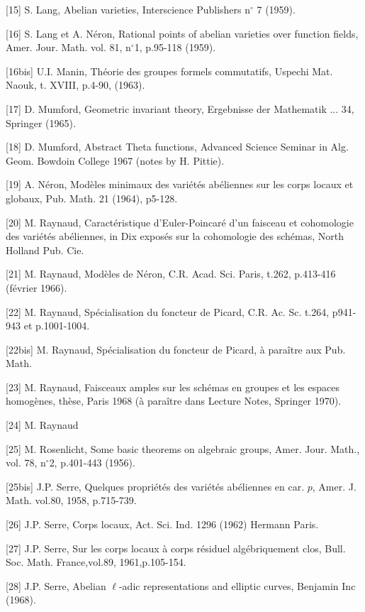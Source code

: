{[}15] S. Lang, Abelian varieties, Interscience Publishers n$^\circ$ 7 (1959).

{[}16] S. Lang et A. Néron, Rational points of abelian varieties over function fields, Amer. Jour. Math. vol. 81, n$^\circ$1, p.95-118 (1959).

{[}16bis] U.I. Manin, Théorie des groupes formels commutatifs, Uspechi Mat. Naouk, t. XVIII, p.4-90, (1963).

{[}17] D. Mumford, Geometric invariant theory, Ergebnisse der Mathematik ... 34, Springer (1965).

{[}18] D. Mumford, Abstract Theta functions, Advanced Science Seminar in Alg. Geom. Bowdoin College 1967 (notes by H. Pittie).

{[}19] A. Néron, Modèles minimaux des variétés abéliennes sur les corps locaux et globaux, Pub. Math. 21 (1964), p5-128.

{[}20] M. Raynaud, Caractéristique  d'Euler-Poincaré d'un faisceau et cohomologie des variétés abéliennes, in Dix exposés sur la cohomologie des schémas, North Holland Pub. Cie.

{[}21] M. Raynaud, Modèles de Néron, C.R. Acad. Sci. Paris, t.262, p.413-416 (février 1966).

{[}22] M. Raynaud, Spécialisation du foncteur de Picard, C.R. Ac. Sc. t.264, p941-943 et p.1001-1004.

{[}22bis] M. Raynaud, Spécialisation du foncteur de Picard, à paraître aux Pub. Math.



{[23]} M. Raynaud, Faisceaux amples sur les schémas en groupes et les espaces homogènes, thèse, Paris 1968 (à paraître dans Lecture Notes, Springer 1970).

{[24]} M. Raynaud

{[25]} M. Rosenlicht, Some basic theorems on algebraic groups, Amer. Jour. Math., vol. 78, n$^{\circ}$2, p.401-443 (1956).

{[25bis]} J.P. Serre, Quelques propriétés des variétés abéliennes en car. $p$, Amer. J. Math. vol.80, 1958, p.715-739.

{[26]} J.P. Serre, Corps locaux, Act. Sci. Ind. 1296 (1962) Hermann Paris.

{[27]} J.P. Serre, Sur les corps locaux à corps résiduel algébriquement clos, Bull. Soc. Math. France,vol.89, 1961,p.105-154.

{[28]} J.P. Serre, Abelian $\ell$-adic representations and elliptic curves, Benjamin Inc (1968).

